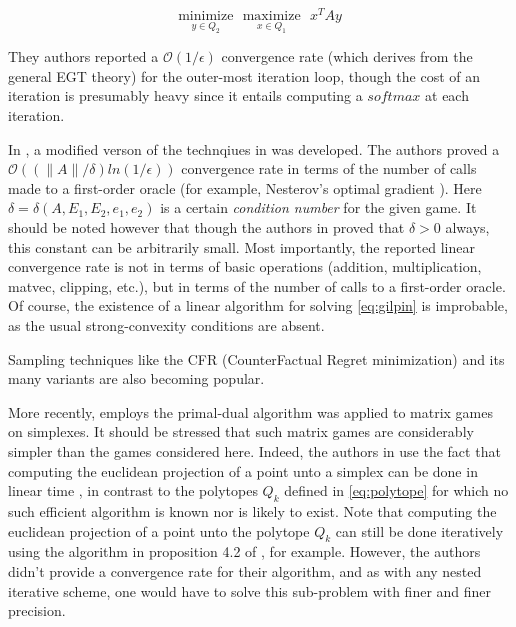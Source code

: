 \documentclass{article} %
\begin{document}
\begin{equation}
  \underset{y \in Q_2}{\text{minimize}}\text{ }\underset{x \in Q_1}{\text{maximize}}\text{ }x^TAy
  \label{eq:gilpin}
\end{equation}

They authors reported a $\mathcal{O}(1/\epsilon)$ convergence rate (which derives from the general EGT theory) for the outer-most iteration loop, though the cost of an iteration is presumably heavy since it entails computing a $softmax$ at each iteration.

In \cite{gilpinfirst}, a modified verson of the technqiues in \cite{hoda2010smoothing} was developed. The authors proved a $\mathcal{O}\left(\left(\|A\| / \delta\right) ln\left(1 / \epsilon\right)\right)$ convergence rate in terms of the number of calls made to a first-order oracle (for example, Nesterov's optimal gradient \cite{nesterov1983}). Here $\delta = \delta(A, E_1, E_2, e_1, e_2)$ is a certain \textit{condition number} for the given game.
It should be noted however that though the authors in \cite{gilpinfirst} proved that $\delta > 0$ always, this constant can be arbitrarily small. Most importantly, the reported linear convergence rate is not in terms of basic operations (addition, multiplication, matvec, clipping, etc.), but in terms of the number of calls to a first-order oracle. Of course, the existence of a linear algorithm for solving \eqref{eq:gilpin} is improbable, as the usual strong-convexity conditions are absent.


Sampling techniques like the CFR (CounterFactual Regret minimization) and its many variants \cite{MartinZinkevichNIPS2007, lanctot2009monte, Bowling09012015} are also becoming popular.

More recently, \cite{chambolle2014ergodic} employs the primal-dual algorithm was applied to matrix games on simplexes. It should be stressed that such matrix games are considerably simpler than the games considered here. Indeed, the authors in \cite{chambolle2014ergodic} use the fact that computing the euclidean projection of a point unto a simplex can be done in linear time \cite{duchi2008efficient}, in contrast to the polytopes $Q_k$ defined in \eqref{eq:polytope} for which no such efficient algorithm is known nor is likely to exist. Note that computing the euclidean projection of a point unto the polytope $Q_k$ can still be done iteratively using the algorithm in proposition 4.2 of \cite{combettes2010dualization}, for example. However, the authors didn't provide a convergence rate for their algorithm, and as with any nested iterative scheme, one would have to solve this sub-problem with finer and finer precision.
\end{document}
